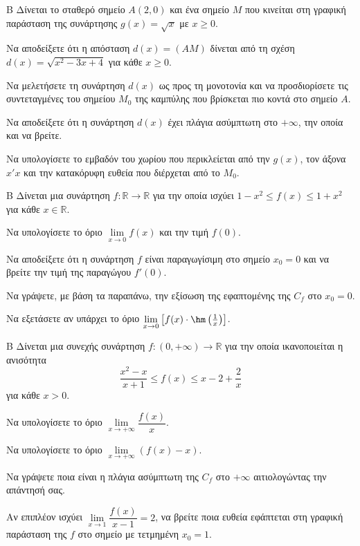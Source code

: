 \begin{thema}{Β}
Δίνεται το σταθερό σημείο $A(2, 0)$ και ένα σημείο $M$ που κινείται στη γραφική παράσταση της συνάρτησης $g(x) = \sqrt{x}$ με $x \ge 0$.
\begin{erwthma}
  \item Να αποδείξετε ότι η απόσταση $d(x) = (AM)$ δίνεται από τη σχέση $d(x) = \sqrt{x^2 - 3x + 4}$ για κάθε $x \ge 0$.
  \item Να μελετήσετε τη συνάρτηση $d(x)$ ως προς τη μονοτονία και να προσδιορίσετε τις συντεταγμένες του σημείου $M_{0}$ της καμπύλης που βρίσκεται πιο κοντά στο σημείο $A$.
  \item Να αποδείξετε ότι η συνάρτηση $d(x)$ έχει πλάγια ασύμπτωτη στο $+\infty$, την οποία και να βρείτε.
  \item Να υπολογίσετε το εμβαδόν του χωρίου που περικλείεται από την $g(x)$, τον άξονα $x'x$ και την κατακόρυφη ευθεία που διέρχεται από το $M_0$.
\end{erwthma}
\end{thema}

\begin{thema}{Β}
Δίνεται μια συνάρτηση $f: \mathbb{R} \to \mathbb{R}$ για την οποία ισχύει $1 - x^2 \le f(x) \le 1 + x^2$ για κάθε $x \in \mathbb{R}$.
\begin{erwthma}
  \item Να υπολογίσετε το όριο $\lim\limits_{x \to 0} f(x)$ και την τιμή $f(0)$.
  \item Να αποδείξετε ότι η συνάρτηση $f$ είναι παραγωγίσιμη στο σημείο $x_0=0$ και να βρείτε την τιμή της παραγώγου $f'(0)$.
  \item Να γράψετε, με βάση τα παραπάνω, την εξίσωση της εφαπτομένης της $C_f$ στο $x_0=0$.
  \item Να εξετάσετε αν υπάρχει το όριο $\lim\limits_{x \to 0} \left[ f(x) \cdot \hm\left(\frac{1}{x}\right) \right]$.
\end{erwthma}
\end{thema}

\begin{thema}{Β}
Δίνεται μια συνεχής συνάρτηση $f: (0, +\infty) \to \mathbb{R}$ για την οποία ικανοποιείται η ανισότητα \[\dfrac{x^2 - x}{x+1} \le f(x) \le x - 2 + \dfrac{2}{x}\] για κάθε $x > 0$.
\begin{erwthma}
  \item Να υπολογίσετε το όριο $\lim\limits_{x \to +\infty} \dfrac{f(x)}{x}$.
  \item Να υπολογίσετε το όριο $\lim\limits_{x \to +\infty} (f(x) - x)$.
  \item Να γράψετε ποια είναι η πλάγια ασύμπτωτη της $C_f$ στο $+\infty$ αιτιολογώντας την απάντησή σας.
  \item Αν επιπλέον ισχύει $\lim\limits_{x \to 1} \dfrac{f(x)}{x-1} = 2$, να βρείτε ποια ευθεία εφάπτεται στη γραφική παράσταση της $f$ στο σημείο με τετμημένη $x_0=1$.
\end{erwthma}
\end{thema}

